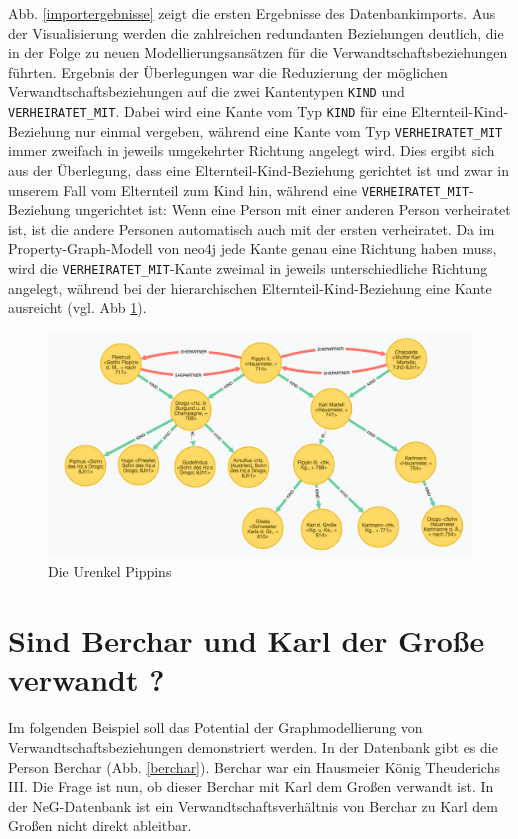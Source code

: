 \documentclass[ngerman,]{scrreprt}
\begin{document}
Abb. \ref{importergebnisse} zeigt die ersten Ergebnisse des Datenbankimports. Aus der Visualisierung werden die zahlreichen redundanten Beziehungen deutlich, die in der Folge zu neuen Modellierungsansätzen für die Verwandtschaftsbeziehungen führten. Ergebnis der Überlegungen war die Reduzierung der möglichen Verwandtschaftsbeziehungen auf die zwei Kantentypen \texttt{KIND} und \texttt{VERHEIRATET\_MIT}. Dabei wird eine Kante vom Typ \texttt{KIND} für eine Elternteil-Kind-Beziehung nur einmal vergeben, während eine Kante vom Typ \texttt{VERHEIRATET\_MIT} immer zweifach in jeweils umgekehrter Richtung angelegt wird. Dies ergibt sich aus der Überlegung, dass eine Elternteil-Kind-Beziehung gerichtet ist und zwar in unserem Fall vom Elternteil zum Kind hin, während eine \texttt{VERHEIRATET\_MIT}-Beziehung ungerichtet ist: Wenn eine Person mit einer anderen Person verheiratet ist, ist die andere Personen automatisch auch mit der ersten verheiratet. Da im Property-Graph-Modell von neo4j jede Kante genau eine Richtung haben muss, wird die \texttt{VERHEIRATET\_MIT}-Kante zweimal in jeweils unterschiedliche Richtung angelegt, während bei der hierarchischen Elternteil-Kind-Beziehung eine Kante ausreicht (vgl. Abb \ref{urenkel}).

\begin{figure}
\centering
\includegraphics{Bilder/NeG/030-Urenkel-Pippins.jpg}
\caption{Die Urenkel Pippins}
\label{urenkel}
\end{figure}

\hypertarget{sind-berchar-und-karl-der-grouxdfe-verwandt}{%
\section{Sind Berchar und Karl der Große verwandt ?}\label{sind-berchar-und-karl-der-grouxdfe-verwandt}}

Im folgenden Beispiel soll das Potential der Graphmodellierung von Verwandtschaftsbeziehungen demonstriert werden. In der Datenbank gibt es die Person Berchar (Abb. \ref{berchar}). Berchar war ein Hausmeier König Theuderichs III. Die Frage ist nun, ob dieser Berchar mit Karl dem Großen verwandt ist. In der NeG-Datenbank ist ein Verwandtschaftsverhältnis von Berchar zu Karl dem Großen nicht direkt ableitbar.
\end{document}
